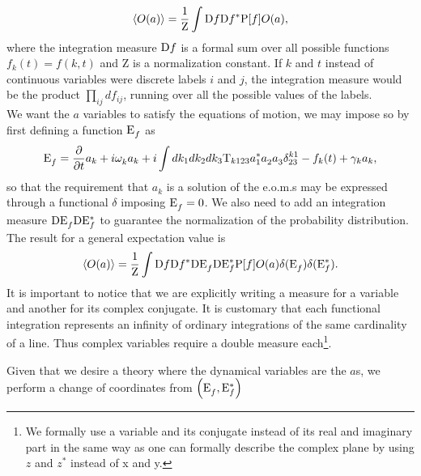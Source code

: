 \begin{equation}
    \langle O(a) \rangle = \frac{1}{\mathrm{Z}}\int \mathrm{D} f \mathrm{D} f^* \mathrm{P}[f] O(a), 
\end{equation}
where the integration measure $\mathrm{D} f$ is a formal sum over all possible functions $f_k(t) = f(k,t)$ and $\mathrm{Z}$ is a normalization constant. If $k$ and $t$ instead of continuous variables were discrete labels $i$ and $j$,
the integration measure would be the product $\prod_{ij}d f_{ij}$, running over all the possible values of the labels. \\
We want the $a$ variables to satisfy the equations of motion, we may impose so by first defining a function $\mathrm{E}_f^{}$ as
\begin{equation}
    \mathrm{E}_f^{} = \frac{\partial}{\partial t} a_k + i \omega^{}_k a_k +i \int dk_1 dk_2 dk_3\mathrm{T}_{k123} a_1^*a_2^{}a_3^{} \delta^{k1}_{23} - f_k(t) + \gamma_k a_k,
    \label{Eeffe}
\end{equation}  
so that the requirement that $a_k^{}$ is a solution of the e.o.m.s may be expressed through a functional $\delta$ imposing $\mathrm{E}_f^{} = 0$. We also need to add an integration measure
$\mathrm{D} \mathrm{E}_f^{} \mathrm{D} \mathrm{E}_f^*$ to guarantee the normalization of the probability distribution. The result for a general expectation value is
\begin{equation}
    \langle O(a) \rangle = \frac{1}{\mathrm{Z}}\int \mathrm{D} f \mathrm{D} f^* \mathrm{D} \mathrm{E}_f^{} \mathrm{D} \mathrm{E}_f^* \mathrm{P}[f] O(a)\delta(\mathrm{E}_f^{})\delta(\mathrm{E}_f^*).
\end{equation} 
It is important to notice that we are explicitly writing a measure for a variable and another for its complex conjugate. It is customary that each functional integration
represents an infinity of ordinary integrations of the same cardinality of a line. Thus complex variables require a double measure each\footnote{We formally use a variable 
and its conjugate instead of its real and imaginary part in the same way as one can formally describe the complex plane by using $z$ and $z^*$ instead of x and y.}.\\

Given that we desire a theory where the dynamical variables are the $a$s, we perform a change of coordinates from $\left(\mathrm{E}_f^{},\mathrm{E}_f^* \right)$
